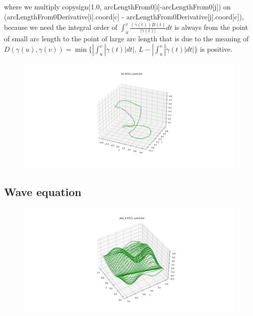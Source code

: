 \documentclass[12pt]{article}
\begin{document}
%
where we multiply \textsf{copysign(1.0, arcLengthFrom0[i]-arcLengthFrom0[j])} on \textsf{(arcLengthFrom0Derivative[i].coord[c] - arcLengthFrom0Derivative[j].coord[c])}, because we need the integral order of $\int_u^v\frac{(\dot{\gamma}(t))\dot{B}(t)}{|\dot{\gamma}(t)|}dt$ is always from the point of small arc length to the point of large arc length that is due to the meaning of $D(\gamma (u),\gamma (v)) = \min\{ |\int_u^v |\dot{\gamma}(t)|dt|,\, L - |\int_u^v |\dot{\gamma}(t)|dt| \}$ is positive.


\begin{figure}[H]
	\centering
	\includegraphics[width=1.0\linewidth]{../knot_energy/data/knot_energy_ex.png}
\end{figure}





\subsection{Wave equation}


\begin{figure}[H]
	\centering
	\includegraphics[width=1.0\linewidth]{../wave_equation/data/wave_equation_ex.png}
\end{figure}
\end{document}
